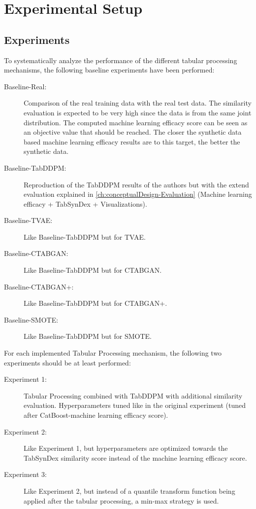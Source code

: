 \section{Experimental Setup}
\label{ch:methods-experimentalSetup}

\subsection{Experiments}
\label{ch:Experiments}

To systematically analyze the performance of the different tabular processing mechanisms, the following baseline experiments have been performed:

\begin{description}
	\item[Baseline-Real:] Comparison of the real training data with the real test data.
		The similarity evaluation is expected to be very high since the data is from the same joint distribution.
		The computed machine learning efficacy score can be seen as an objective value that should be reached.
		The closer the synthetic data based machine learning efficacy results are to this target, the better the synthetic data.
	\item[Baseline-TabDDPM:] Reproduction of the TabDDPM results of the authors \cite{kotelnikov2022TabDDPMModellingTabular} but with the extend evaluation explained in \autoref{ch:conceptualDesign-Evaluation} (Machine learning efficacy + TabSynDex + Visualizations).
	\item[Baseline-TVAE:] Like Baseline-TabDDPM but for TVAE.
	\item[Baseline-CTABGAN:] Like Baseline-TabDDPM but for CTABGAN.
	\item[Baseline-CTABGAN+:] Like Baseline-TabDDPM but for CTABGAN+.
	\item[Baseline-SMOTE:] Like Baseline-TabDDPM but for SMOTE.
\end{description}

For each implemented Tabular Processing mechanism, the following two experiments should be at least performed:

\begin{description}
	\item[Experiment 1:] Tabular Processing combined with TabDDPM with additional similarity evaluation. Hyperparameters tuned like in the original experiment (tuned after CatBoost-machine learning efficacy score).
	\item[Experiment 2:] Like Experiment 1, but hyperparameters are optimized towards the TabSynDex similarity score instead of the machine learning efficacy score.
	\item[Experiment 3:] Like Experiment 2, but instead of a quantile transform function being applied after the tabular processing, a min-max strategy is used.
\end{description}

